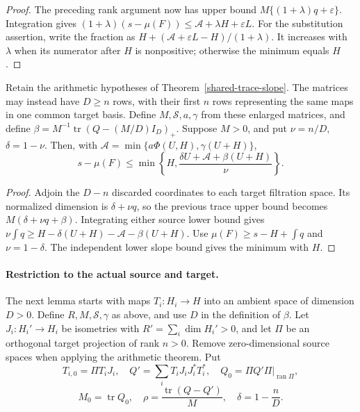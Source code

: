 \begin{proof}
The preceding rank argument now has upper bound
\(M\{(1+\lambda)q+\varepsilon\}\). Integration gives
\((1+\lambda)(s-\mu(F))\le\mathcal A+\lambda H+\varepsilon L\).
For the substitution assertion, write the fraction as
\(H+(\mathcal A+\varepsilon L-H)/(1+\lambda)\).
It increases with \(\lambda\) when its numerator after \(H\) is
nonpositive; otherwise the minimum equals \(H\).
\end{proof}

\begin{corollary}\label{shared-trace-ambient}
Retain the arithmetic hypotheses of Theorem~\ref{shared-trace-slope}.
The matrices may instead have \(D\ge n\) rows, with their first \(n\)
rows representing the same maps in one common target basis. Define
\(M,\mathcal S,a,\gamma\) from these enlarged matrices, and define
\(\beta=M^{-1}\operatorname{tr}(Q-(M/D)I_D)_+\).
Suppose \(M>0\), and put \(\nu=n/D\), \(\delta=1-\nu\).
Then, with \(\mathcal A=\min\{a\Phi(U,H),\gamma(U+H)\}\),
\begin{equation}\label{shared-trace-ambient-bound}
 s-\mu(F)\le
 \min\left\{H,\frac{\delta U+\mathcal A+\beta(U+H)}{\nu}\right\}.
\end{equation}
\end{corollary}

\begin{proof}
Adjoin the \(D-n\) discarded coordinates to each target filtration
space. Its normalized dimension is \(\delta+\nu q\), so the previous
trace upper bound becomes \(M(\delta+\nu q+\beta)\).
Integrating either source lower bound gives
\(\nu\int q\ge H-\delta(U+H)-\mathcal A-\beta(U+H)\).
Use \(\mu(F)\ge s-H+\int q\) and \(\nu=1-\delta\).
The independent lower slope bound gives the minimum with \(H\).
\end{proof}

\paragraph{Restriction to the actual source and target.}
The next lemma starts with maps \(T_i:H_i\to H\) into an ambient
space of dimension \(D>0\). Define \(R,M,\mathcal S,\gamma\) as
above, and use \(D\) in the definition of \(\beta\).
Let \(J_i:H_i'\to H_i\) be isometries with
\(R'=\sum_i\dim H_i'>0\), and let \(\Pi\) be an orthogonal
target projection of rank \(n>0\). Remove zero-dimensional source
spaces when applying the arithmetic theorem. Put
\[
 T_{i,0}=\Pi T_iJ_i,\quad
 Q'=\sum_iT_iJ_iJ_i^*T_i^*,\quad
 Q_0=\Pi Q'\Pi|_{\operatorname{ran}\Pi},
\]
\[
 M_0=\operatorname{tr}Q_0,\quad
 \rho=\frac{\operatorname{tr}(Q-Q')}{M},\quad
 \delta=1-\frac nD .
\]

